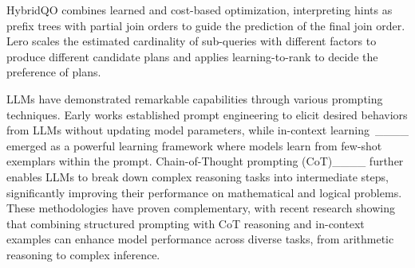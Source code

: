 HybridQO combines learned and cost-based optimization, interpreting hints as prefix trees with partial join orders to guide the prediction of the final join order. 
Lero scales the estimated cardinality of sub-queries with different factors to produce different candidate
plans and applies learning-to-rank to decide the preference of plans.



LLMs have demonstrated remarkable capabilities through various prompting techniques. Early works established prompt engineering to elicit desired behaviors from LLMs without updating model parameters, while in-context learning~____ emerged as a powerful learning framework where models learn from few-shot exemplars within the prompt. 
Chain-of-Thought prompting (CoT)____ further enables LLMs to break down complex reasoning tasks into intermediate steps, significantly improving their performance on mathematical and logical problems. These methodologies have proven complementary, with recent research showing that combining structured prompting with CoT reasoning and in-context examples can enhance model performance across diverse tasks, from arithmetic reasoning to complex inference.

